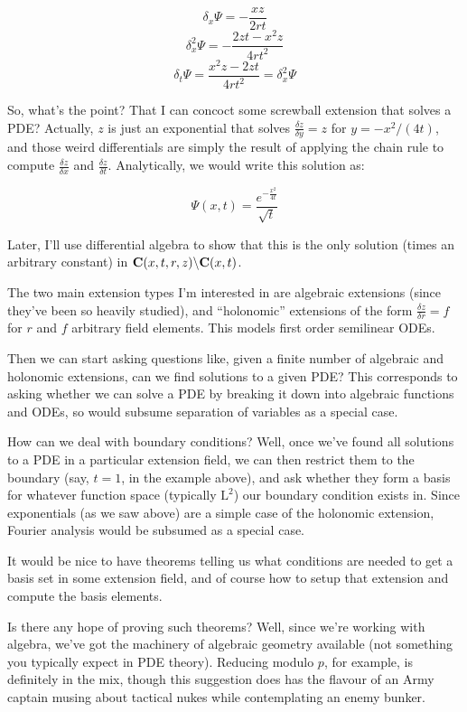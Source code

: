 \documentclass{article}
\newcommand{\C}{\ensuremath{{\bf C}}}
\begin{document}
$$\delta_x \Psi = - \frac{xz}{2rt}$$
$$\delta_x^2 \Psi = - \frac{2zt-x^2z}{4rt^2}$$
$$\delta_t \Psi =  \frac{x^2z - 2zt}{4rt^2} = \delta_x^2 \Psi$$

So, what's the point?  That I can concoct some screwball extension
that solves a PDE?  Actually, $z$ is just an exponential that solves
$\frac{\delta z}{\delta y}=z$ for $y=-x^2/(4t)$, and those weird
differentials are simply the result of applying the chain rule
to compute $\frac{\delta z}{\delta x}$ and $\frac{\delta z}{\delta t}$.
Analytically, we would write this solution as:

$$\Psi(x,t) = \frac{e^{-\frac{x^2}{4t}}}{\sqrt{t}}$$

Later, I'll use differential algebra to show that this is the only
solution (times an arbitrary constant) in $\C(x,t,r,z) \backslash \C(x,t)$.

The two main extension types I'm interested in are algebraic
extensions (since they've been so heavily studied), and ``holonomic''
extensions of the form $\frac{\delta z}{\delta r} = f$ for $r$ and
$f$ arbitrary field elements.  This models first order semilinear ODEs.

Then we can start asking questions like, given a finite number of
algebraic and holonomic extensions, can we find solutions to a given
PDE?  This corresponds to asking whether we can solve a PDE by
breaking it down into algebraic functions and ODEs, so would subsume
separation of variables as a special case.

How can we deal with boundary conditions?  Well, once we've found all
solutions to a PDE in a particular extension field, we can then
restrict them to the boundary (say, $t=1$, in the example above), and
ask whether they form a basis for whatever function space (typically
$\text{L}^2$) our boundary condition exists in.  Since exponentials
(as we saw above) are a simple case of the holonomic extension,
Fourier analysis would be subsumed as a special case.

It would be nice to have theorems telling us what conditions are
needed to get a basis set in some extension field, and of course how
to setup that extension and compute the basis elements.

Is there any hope of proving such theorems?  Well, since we're working
with algebra, we've got the machinery of algebraic geometry available
(not something you typically expect in PDE theory).  Reducing modulo
$p$, for example, is definitely in the mix, though this suggestion
does has the flavour of an Army captain musing about tactical nukes
while contemplating an enemy bunker.
\end{document}
